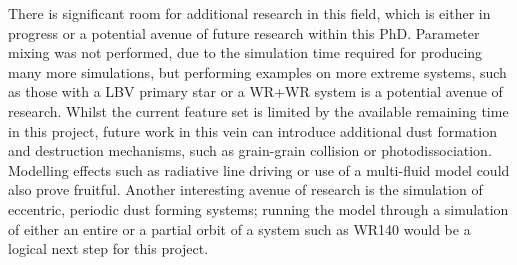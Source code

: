 There is significant room for additional research in this field, which is either in progress or a potential avenue of future research within this PhD.
Parameter mixing was not performed, due to the simulation time required for producing many more simulations, but performing examples on more extreme systems, such as those with a LBV primary star or a WR+WR system is a potential avenue of research.
Whilst the current feature set is limited by the available remaining time in this project, future work in this vein can introduce additional dust formation and destruction mechanisms, such as grain-grain collision or photodissociation.
Modelling effects such as radiative line driving or use of a multi-fluid model could also prove fruitful. 
Another interesting avenue of research is the simulation of eccentric, periodic dust forming systems; running the model through a simulation of either an entire or a partial orbit of a system such as WR140 would be a logical next step for this project.